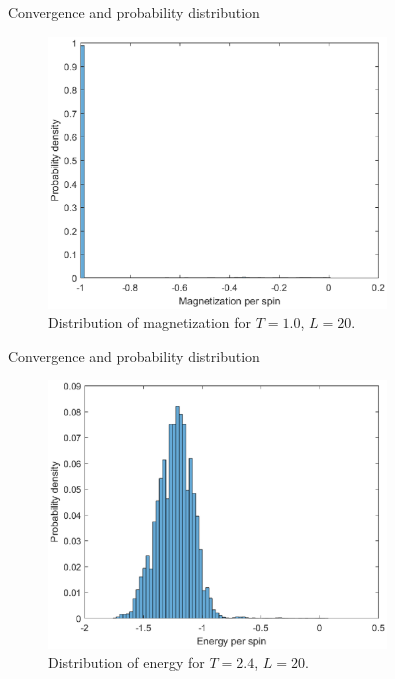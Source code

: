 \documentclass{beamer}
\begin{document}
\begin{frame}{Convergence and probability distribution}
\begin{figure}
\includegraphics[width=0.8\textwidth]{Prob_mag_lowT.eps}
\caption{Distribution of magnetization for $T=1.0$, $L=20$. }
\end{figure}
\end{frame}

\begin{frame}{Convergence and probability distribution}
\begin{figure}
\includegraphics[width=0.8\textwidth]{Prob_ene_highT.eps}
\caption{Distribution of energy for $T=2.4$, $L=20$. }
\end{figure}
\end{frame}
\end{document}
